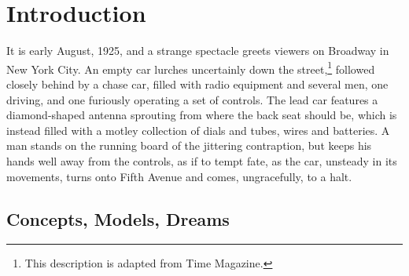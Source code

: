 \chapter{Introduction}
\label{chap:0}


It is early August, 1925, and a strange spectacle greets viewers on
Broadway in New York City. An empty car lurches uncertainly down the
street,\footnote{This description is adapted from Time
  Magazine\cite{???-Science-radio-auto}.} followed closely behind by a
chase car, filled with radio equipment and several men, one driving,
and one furiously operating a set of controls. The lead car features a
diamond-shaped antenna sprouting from where the back seat should be,
which is instead filled with a motley collection of dials and tubes,
wires and batteries. A man stands on the running board of the
jittering contraption, but keeps his
hands well away from the controls, as if to tempt fate, as the car,
unsteady in its movements, turns onto Fifth Avenue and comes,
ungracefully, to a halt.

\section{Concepts, Models, Dreams}


